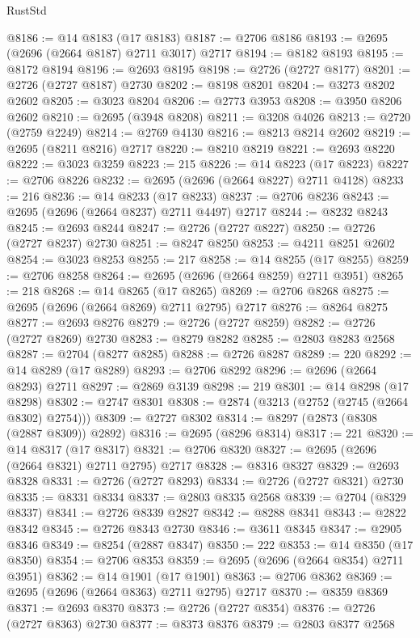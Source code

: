 \begin{lexlean}{RustStd}
\begin{coremodule}
@8186 := @14 @8183 (@17 @8183)
@8187 := @2706 @8186
@8193 := @2695 (@2696 (@2664 @8187) @2711 @3017) @2717
@8194 := @8182 @8193
@8195 := @8172 @8194
@8196 := @2693 @8195
@8198 := @2726 (@2727 @8177)
@8201 := @2726 (@2727 @8187) @2730
@8202 := @8198 @8201
@8204 := @3273 @8202 @2602
@8205 := @3023 @8204
@8206 := @2773 @3953
@8208 := @3950 @8206 @2602
@8210 := @2695 (@3948 @8208)
@8211 := @3208 @4026
@8213 := @2720 (@2759 @2249)
@8214 := @2769 @4130
@8216 := @8213 @8214 @2602
@8219 := @2695 (@8211 @8216) @2717
@8220 := @8210 @8219
@8221 := @2693 @8220
@8222 := @3023 @3259
@8223 := 215
@8226 := @14 @8223 (@17 @8223)
@8227 := @2706 @8226
@8232 := @2695 (@2696 (@2664 @8227) @2711 @4128)
@8233 := 216
@8236 := @14 @8233 (@17 @8233)
@8237 := @2706 @8236
@8243 := @2695 (@2696 (@2664 @8237) @2711 @4497) @2717
@8244 := @8232 @8243
@8245 := @2693 @8244
@8247 := @2726 (@2727 @8227)
@8250 := @2726 (@2727 @8237) @2730
@8251 := @8247 @8250
@8253 := @4211 @8251 @2602
@8254 := @3023 @8253
@8255 := 217
@8258 := @14 @8255 (@17 @8255)
@8259 := @2706 @8258
@8264 := @2695 (@2696 (@2664 @8259) @2711 @3951)
@8265 := 218
@8268 := @14 @8265 (@17 @8265)
@8269 := @2706 @8268
@8275 := @2695 (@2696 (@2664 @8269) @2711 @2795) @2717
@8276 := @8264 @8275
@8277 := @2693 @8276
@8279 := @2726 (@2727 @8259)
@8282 := @2726 (@2727 @8269) @2730
@8283 := @8279 @8282
@8285 := @2803 @8283 @2568
@8287 := @2704 (@8277 @8285)
@8288 := @2726 @8287
@8289 := 220
@8292 := @14 @8289 (@17 @8289)
@8293 := @2706 @8292
@8296 := @2696 (@2664 @8293) @2711
@8297 := @2869 @3139
@8298 := 219
@8301 := @14 @8298 (@17 @8298)
@8302 := @2747 @8301
@8308 := @2874 (@3213 (@2752 (@2745 (@2664 @8302) @2754)))
@8309 := @2727 @8302
@8314 := @8297 (@2873 (@8308 (@2887 @8309)) @2892)
@8316 := @2695 (@8296 @8314)
@8317 := 221
@8320 := @14 @8317 (@17 @8317)
@8321 := @2706 @8320
@8327 := @2695 (@2696 (@2664 @8321) @2711 @2795) @2717
@8328 := @8316 @8327
@8329 := @2693 @8328
@8331 := @2726 (@2727 @8293)
@8334 := @2726 (@2727 @8321) @2730
@8335 := @8331 @8334
@8337 := @2803 @8335 @2568
@8339 := @2704 (@8329 @8337)
@8341 := @2726 @8339 @2827
@8342 := @8288 @8341
@8343 := @2822 @8342
@8345 := @2726 @8343 @2730
@8346 := @3611 @8345
@8347 := @2905 @8346
@8349 := @8254 (@2887 @8347)
@8350 := 222
@8353 := @14 @8350 (@17 @8350)
@8354 := @2706 @8353
@8359 := @2695 (@2696 (@2664 @8354) @2711 @3951)
@8362 := @14 @1901 (@17 @1901)
@8363 := @2706 @8362
@8369 := @2695 (@2696 (@2664 @8363) @2711 @2795) @2717
@8370 := @8359 @8369
@8371 := @2693 @8370
@8373 := @2726 (@2727 @8354)
@8376 := @2726 (@2727 @8363) @2730
@8377 := @8373 @8376
@8379 := @2803 @8377 @2568

\end{coremodule}
\end{lexlean}
